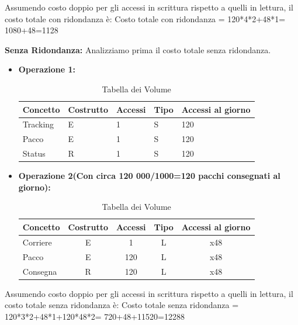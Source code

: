 Assumendo costo doppio per gli accessi in scrittura rispetto a quelli in lettura, il costo totale con ridondanza è:
Costo totale con ridondanza = 120*4*2+48*1= 1080+48=1128

\textbf{Senza Ridondanza:} Analizziamo prima il costo totale senza ridondanza.
\begin{itemize}
    \item \textbf{Operazione 1:} 
     
        \begin{table}[H]
        \centering
        \begin{tabular} {lllll}
        \toprule
        \textbf{Concetto} & \textbf{Costrutto} & \textbf{Accessi} & \textbf{Tipo} & \textbf{Accessi al giorno}\\ [0.5ex]
        \midrule
            Tracking & E & 1 & S & 120\\
            Pacco & E & 1 & S & 120\\
            Status & R & 1 & S & 120\\ 
        \bottomrule
           \end{tabular}
            \caption{Tabella dei Volume}
    \end{table}

    \item \textbf{Operazione 2(Con circa 120 000/1000=120 pacchi consegnati al giorno):}
        \begin{table}[ht]
        \centering
        \begin{tabular} {lcccc}
        \toprule
        \textbf{Concetto} & \textbf{Costrutto} & \textbf{Accessi} & \textbf{Tipo} & \textbf{Accessi al giorno}\\ [0.5ex]
        \midrule
            Corriere & E & 1 & L & x48\\
            Pacco & E & 120 & L & x48\\
            Consegna & R & 120 & L & x48\\ 
            \bottomrule
           \end{tabular}
            \caption{Tabella dei Volume}
    \end{table}

\end{itemize}
Assumendo costo doppio per gli accessi in scrittura rispetto a quelli in lettura, il costo totale senza ridondanza è:
Costo totale senza ridondanza = 120*3*2+48*1+120*48*2= 720+48+11520=12288


